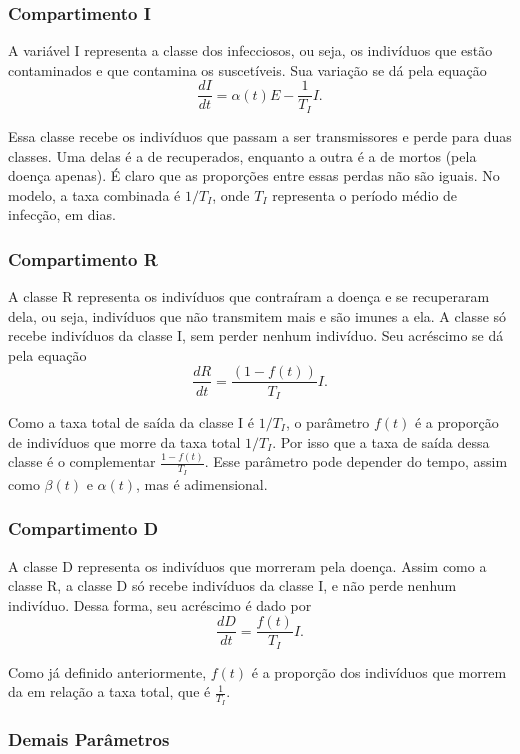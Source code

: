 \documentclass{article}
\begin{document}
	\subsubsection{Compartimento I}
	A variável I representa a classe dos infecciosos, ou seja, os indivíduos que estão contaminados e que contamina os suscetíveis. Sua variação se dá pela equação
	\[\dfrac{dI}{dt} = \alpha(t) E - \dfrac{1}{T_I}I.\]
	
	Essa classe recebe os indivíduos que passam a ser transmissores e perde para duas classes. Uma delas é a de recuperados, enquanto a outra é a de mortos (pela doença apenas). É claro que as proporções entre essas perdas não são iguais. No modelo, a taxa combinada é $1/T_I$, onde $T_I$ representa o período médio de infecção, em dias.
	
	\subsubsection{Compartimento R}
	A classe R representa os indivíduos que contraíram a doença e se recuperaram dela, ou seja, indivíduos que não transmitem mais e são imunes a ela. A classe só recebe indivíduos da classe I, sem perder nenhum indivíduo. Seu acréscimo se dá pela equação
	\[\dfrac{dR}{dt} = \dfrac{(1 - f(t))}{T_I}I.\]
	
	Como a taxa total de saída da classe I é $1/T_I$, o parâmetro $f(t)$ é a proporção de indivíduos que morre da taxa total $1/T_I$. Por isso que a taxa de saída dessa classe é o complementar $\frac{1 - f(t)}{T_I}$. Esse parâmetro pode depender do tempo, assim como $\beta(t)$ e $\alpha(t)$, mas é adimensional.
	
	\subsubsection{Compartimento D}
	A classe D representa os indivíduos que morreram pela doença. Assim como a classe R, a classe D só recebe indivíduos da classe I, e não perde nenhum indivíduo. Dessa forma, seu acréscimo é dado por
	\[\dfrac{dD}{dt} = \dfrac{f(t)}{T_I}I.\]
	
	Como já definido anteriormente, $f(t)$ é a proporção dos indivíduos que morrem da em relação a taxa total, que é $\frac{1}{T_I}$. 
	
	\subsubsection{Demais Parâmetros}
	
\end{document}

